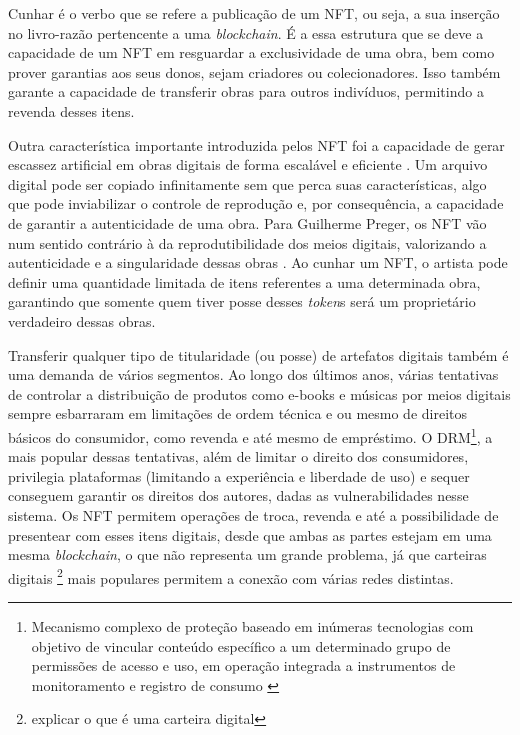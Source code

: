 Cunhar é o verbo que se refere a publicação de um NFT, ou seja, a sua inserção no livro-razão pertencente a uma \textit{blockchain}. É a essa estrutura que se deve a capacidade de um NFT em resguardar a exclusividade de uma obra, bem como prover garantias aos seus donos, sejam criadores ou colecionadores. Isso também garante a capacidade de transferir obras para outros indivíduos, permitindo a revenda desses itens.

Outra característica importante introduzida pelos NFT foi a capacidade de gerar escassez artificial em obras digitais de forma escalável e eficiente \cite{Kugler}. Um arquivo digital pode ser copiado infinitamente sem que perca suas características, algo que pode inviabilizar o controle de reprodução e, por consequência, a capacidade de garantir a autenticidade de uma obra. Para Guilherme Preger, os NFT vão num sentido contrário à da reprodutibilidade dos meios digitais, valorizando a autenticidade e a singularidade dessas obras \cite{Preger}. Ao cunhar um NFT, o artista pode definir uma quantidade limitada de itens referentes a uma determinada obra, garantindo que somente quem tiver posse desses \textit{token}s será um proprietário verdadeiro dessas obras. 

Transferir qualquer tipo de titularidade (ou posse) de artefatos digitais também é uma demanda de vários segmentos. Ao longo dos últimos anos, várias tentativas de controlar a distribuição de produtos como e-books e músicas por meios digitais sempre esbarraram em limitações de ordem técnica e ou mesmo de direitos básicos do consumidor, como revenda e até mesmo de empréstimo. O DRM\footnote{Mecanismo complexo de proteção baseado em inúmeras tecnologias com objetivo de vincular conteúdo específico a um determinado grupo de permissões de acesso e uso, em operação integrada a instrumentos de monitoramento e registro de consumo \cite{Vieira}}, a mais popular dessas tentativas, além de limitar o direito dos consumidores, privilegia plataformas (limitando a experiência e liberdade de uso) e sequer conseguem garantir os direitos dos autores, dadas as vulnerabilidades nesse sistema. Os NFT permitem operações de troca, revenda e até a possibilidade de presentear com esses itens digitais, desde que ambas as partes estejam em uma mesma \textit{blockchain}, o que não representa um grande problema, já que carteiras digitais \footnote{explicar o que é uma carteira digital} mais populares permitem a conexão com várias redes distintas. 

